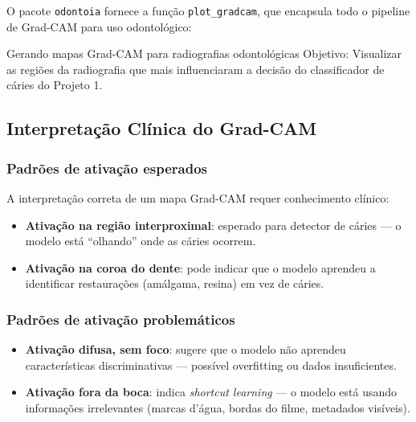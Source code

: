 O pacote \texttt{odontoia} fornece a função \texttt{plot\_gradcam}, que
encapsula todo o pipeline de Grad-CAM para uso odontológico:

\begin{pratica}{Gerando mapas Grad-CAM para radiografias odontológicas}
  Objetivo: Visualizar as regiões da radiografia que mais influenciaram
  a decisão do classificador de cáries do Projeto 1.
\end{pratica}


\subsection{Interpretação Clínica do Grad-CAM}

\subsubsection{Padrões de ativação esperados}

A interpretação correta de um mapa Grad-CAM requer conhecimento clínico:

\begin{itemize}
  \item \textbf{Ativação na região interproximal}: esperado para detector
    de cáries — o modelo está ``olhando'' onde as cáries ocorrem.
  \item \textbf{Ativação na coroa do dente}: pode indicar que o modelo
    aprendeu a identificar restaurações (amálgama, resina) em vez de cáries.
\end{itemize}

\subsubsection{Padrões de ativação problemáticos}

\begin{itemize}
  \item \textbf{Ativação difusa, sem foco}: sugere que o modelo não
    aprendeu características discriminativas — possível overfitting ou
    dados insuficientes.
  \item \textbf{Ativação fora da boca}: indica \textit{shortcut learning}
    — o modelo está usando informações irrelevantes (marcas d'água,
    bordas do filme, metadados visíveis).
\end{itemize}


